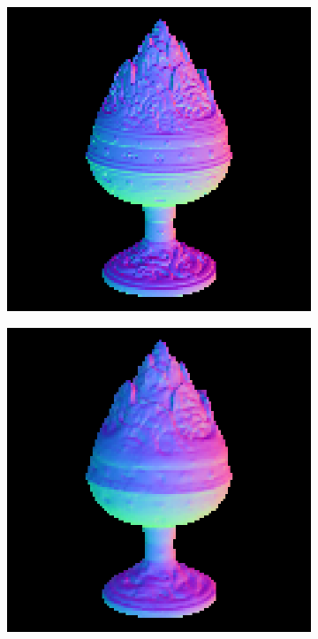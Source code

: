\begin{figure}
\begin{subfigure}[b]{0.24\linewidth}
		\includegraphics[width=\linewidth]{./Figures/gcnn_synthetic/fancy_eval_2_groundtruth.png}
	\end{subfigure}
	\begin{subfigure}[b]{0.24\linewidth}
		\includegraphics[width=\linewidth]{./Figures/gcnn_synthetic/fancy_eval_2_normal_GCNN-GCNN.png}

\end{subfigure}
\end{figure}
